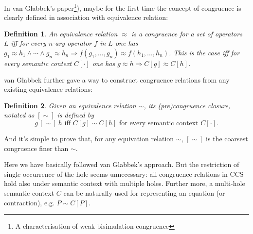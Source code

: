 \documentclass{eptcs} %
\newtheorem{definition}{Definition}[section]
\begin{document}
In van Glabbek's paper\footnote{A characterisation of weak
  bisimulation congruence}), maybe for the first time the concept of
congruence is clearly defined in association with equivalence
relation:
\begin{definition}
An equivalence relation $\approx$ is a congruence for a set of
operators $L$ iff for every $n$-ary operator $f$ in $L$ one has
$g_1\approx h_1 \wedge \cdots \wedge g_n \approx h_n \Rightarrow
f(g_1,\ldots,g_n) \approx f(h_1,\ldots,h_n)$. This is the case iff for
every semantic context $C[\cdot]$ one has $g\approx h \Rightarrow
C[g]\approx C[h]$.
\end{definition}

van Glabbek further gave a way to construct congruence relations from
any existing equivalence relations:
\begin{definition}
\label{def:precc}
Given an equivalence relation $\sim$, its (pre)congruence closure,
notated as $[\sim]$ is defined by
\begin{equation}
g\,[\sim]\, h \mbox{ iff } C[g] \sim C[h] \mbox{ for every semantic
  context } C[\cdot].
\end{equation}
\end{definition}
And it's simple to prove that, for any equivation relation $\sim$,
$[\sim]$ is the coarsest congruence finer than $\sim$.

Here we have basically followed van Glabbek's approach. But the
restriction of single occurrence of the hole seems unnecessary: all
congruence relations in CCS hold also under semantic context with
multiple holes. Further more, a multi-hole semantic context $C$ can be
naturally used for representing an equation (or contraction), e.g. $P
\sim C[P]$.
\end{document}

